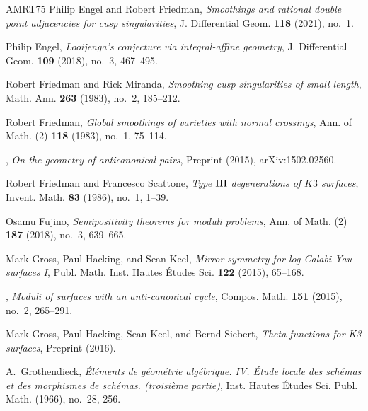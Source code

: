 \documentclass[table,x11names]{amsart}
\begin{document}
\begin{thebibliography}{AMRT75}
Philip Engel and Robert Friedman, \emph{Smoothings and rational double point
  adjacencies for cusp singularities}, J. Differential Geom. \textbf{118}
  (2021), no.~1. 

Philip Engel, \emph{Looijenga's conjecture via integral-affine geometry}, J.
  Differential Geom. \textbf{109} (2018), no.~3, 467--495. 

Robert Friedman and Rick Miranda, \emph{Smoothing cusp singularities of small
  length}, Math. Ann. \textbf{263} (1983), no.~2, 185--212. 

Robert Friedman, \emph{Global smoothings of varieties with normal crossings},
  Ann. of Math. (2) \textbf{118} (1983), no.~1, 75--114. 

\bysame, \emph{On the geometry of anticanonical pairs}, Preprint (2015),
  arXiv:1502.02560.

Robert Friedman and Francesco Scattone, \emph{Type {${\rm III}$} degenerations
  of {$K3$} surfaces}, Invent. Math. \textbf{83} (1986), no.~1, 1--39.

Osamu Fujino, \emph{Semipositivity theorems for moduli problems}, Ann. of Math.
  (2) \textbf{187} (2018), no.~3, 639--665. 

Mark Gross, Paul Hacking, and Sean Keel, \emph{Mirror symmetry for log
  {C}alabi-{Y}au surfaces {I}}, Publ. Math. Inst. Hautes \'{E}tudes Sci.
  \textbf{122} (2015), 65--168. 

\bysame, \emph{Moduli of surfaces with an anti-canonical cycle}, Compos. Math.
  \textbf{151} (2015), no.~2, 265--291. 

Mark Gross, Paul Hacking, Sean Keel, and Bernd Siebert, \emph{Theta functions
  for {K3} surfaces}, Preprint (2016).

A.~Grothendieck, \emph{\'{E}l\'ements de g\'eom\'etrie alg\'ebrique. {IV}.
  \'{E}tude locale des sch\'emas et des morphismes de sch\'emas. (troisi\`eme
  partie)}, Inst. Hautes \'Etudes Sci. Publ. Math. (1966), no.~28, 256.


\end{thebibliography}
\end{document}
